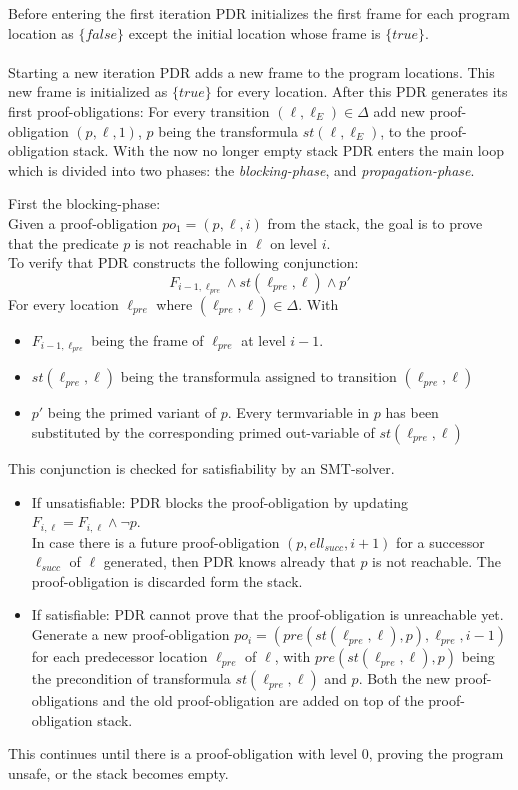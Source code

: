 \documentclass{article}
\begin{document}
	Before entering the first iteration PDR initializes the first frame for each program location as $\{ false \}$ except the initial location whose frame is $\{ true \}$. \\ \\
	
	Starting a new iteration PDR adds a new frame to the program locations. This new frame is initialized as $\{true\}$ for every location. After this PDR generates its first proof-obligations: For every transition $(\ell, \ell_E) \in \Delta$ add new proof-obligation $(p, \ell, 1)$, $p$ being the transformula $st(\ell, \ell_E)$, to the proof-obligation stack. With the now no longer empty stack PDR enters the main loop which is divided into two phases: the \textsl{blocking-phase}, and \textsl{propagation-phase}.
	
	\bigskip
	
	First the blocking-phase: \\ 
	Given a proof-obligation $po_1 = (p, \ell, i)$ from the stack, the goal is to prove that the predicate $p$ is not reachable in $\ell$ on level $i$. \\ To verify that PDR constructs the following conjunction:
	\begin{equation*}
		F_{i - 1, \ell_{pre}} \land st(\ell_{pre}, \ell) \land p'
	\end{equation*}
	For every location $\ell_{pre}$ where $(\ell_{pre}, \ell) \in \Delta$. With 
	\begin{itemize}
		\item $F_{i - 1, \ell_{pre}}$ being the frame of $\ell_{pre}$ at level $i - 1$.
		\item $st(\ell_{pre}, \ell)$ being the transformula assigned to transition $(\ell_{pre}, \ell)$
		\item $p'$ being the primed variant of $p$. Every termvariable in $p$ has been substituted by the corresponding primed out-variable of $st(\ell_{pre}, \ell)$
	\end{itemize}
	This conjunction is checked for satisfiability by an SMT-solver.
	\begin{itemize}
		\item If unsatisfiable: PDR blocks the proof-obligation by updating $F_{i, \ell} = F_{i, \ell} \land \neg p$. \\ In case there is a future proof-obligation $(p, ell_{succ}, i + 1)$ for a successor $\ell_{succ}$ of $\ell$ generated, then PDR knows already that $p$ is not reachable. The proof-obligation is discarded form the stack.
		\item If satisfiable: PDR cannot prove that the proof-obligation is unreachable yet. Generate a new proof-obligation $po_i = (pre(st(\ell_{pre}, \ell), p), \ell_{pre}, i-1) $ for each predecessor location $\ell_{pre}$ of $\ell$, with $pre(st(\ell_{pre}, \ell), p)$ being the precondition of transformula $st(\ell_{pre}, \ell)$ and $p$. Both the new proof-obligations and the old proof-obligation are added on top of the proof-obligation stack.
	\end{itemize}
	This continues until there is a proof-obligation with level 0, proving the program unsafe, or the stack becomes empty.
	\bigskip
	
\end{document}
